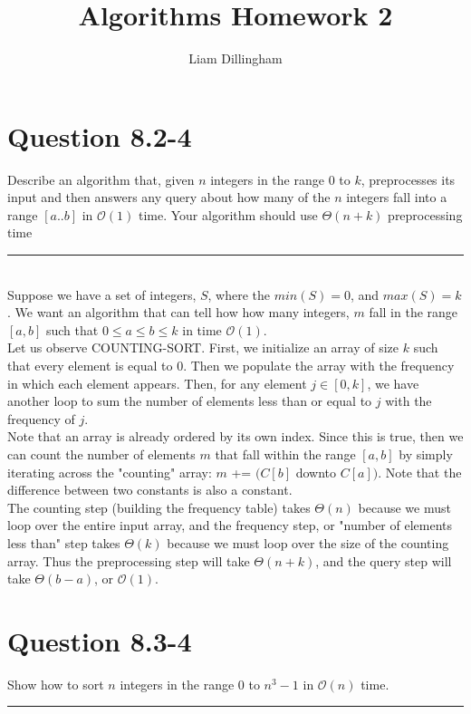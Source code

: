 \documentclass[20pt]{article} %
\title{Algorithms Homework 2}
\author{Liam Dillingham}
\begin{document}
\maketitle

\section{Question 8.2-4}
Describe an algorithm that, given $n$ integers in the range $0$ to $k$, preprocesses its input and then answers any query about how many of the $n$ integers fall into a range $[a..b]$ in $\mathcal{O}(1)$ time. Your algorithm should use $\Theta(n+k)$ preprocessing time \\ 
\noindent\rule{2cm}{0.4pt} \\ 

Suppose we have a set of integers, $S$, where the $min(S) = 0$, and $max(S) = k$.  We want an algorithm that can tell how how many integers, $m$ fall in the range $[a,b]$ such that 
$0 \leq a \leq b \leq k$ in time $\mathcal{O}(1)$. \\

Let us observe COUNTING-SORT.  First, we initialize an array of size $k$ such that every element is equal to $0$. Then we populate the array with the frequency in which each element appears.  Then, for any element $j \in [0,k]$, we have another loop to sum the number of elements less than or equal to $j$ with the frequency of $j$.  \\

Note that an array is already ordered by its own index.  Since this is true, then we can count the number of elements $m$ that fall within the range $[a,b]$ by simply iterating across the "counting" array: $m$ += $(C[b]$ downto $C[a])$. Note that the difference between two constants is also a constant. \\

The counting step (building the frequency table) takes $\Theta(n)$ because we must loop over the entire input array, and the frequency step, or "number of elements less than" step takes $\Theta(k)$ because we must loop over the size of the counting array.  Thus the preprocessing step will take $\Theta(n+k)$, and the query step will take $\Theta(b-a)$, or $\mathcal{O}(1)$.

\newpage
\section{Question 8.3-4}
Show how to sort $n$ integers in the range $0$ to $n^{3} -1$ in $\mathcal{O}(n)$ time. \\ 
\noindent\rule{2cm}{0.4pt} \\ 
\end{document}
